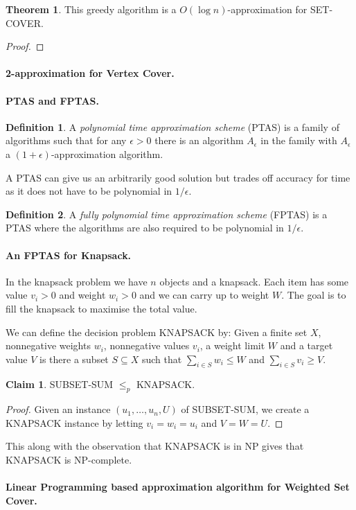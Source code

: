 \documentclass[11pt,a4paper]{article}
\theoremstyle{definition}
\newtheorem{thm}{Theorem}
\newtheorem{claim}{Claim}
\newtheorem{defn}{Definition}
\begin{document}
\begin{thm}
This greedy algorithm is a $O(\log n)$-approximation for SET-COVER.
\end{thm}
\begin{proof}

\end{proof}

\paragraph{2-approximation for Vertex Cover.}

\paragraph{PTAS and FPTAS.}
\begin{defn}
A \emph{polynomial time approximation scheme} (PTAS) is a family of algorithms such that for any $\epsilon > 0$ there is an algorithm $A_\epsilon$ in the family with $A_\epsilon$ a $(1+\epsilon)$-approximation algorithm.
\end{defn}

A PTAS can give us an arbitrarily good solution but trades off accuracy for time as it does not have to be polynomial in $1/\epsilon$.

\begin{defn}
A \emph{fully polynomial time approximation scheme} (FPTAS) is a PTAS where the algorithms are also required to be polynomial in $1/\epsilon$.
\end{defn}

\paragraph{An FPTAS for Knapsack.}
In the knapsack problem we have $n$ objects and a knapsack.
Each item has some value $v_i>0$ and weight $w_i>0$ and we can carry up to weight $W$.
The goal is to fill the knapsack to maximise the total value.

We can define the decision problem KNAPSACK by: Given a finite set $X$, nonnegative weights $w_i$, nonnegative values $v_i$, a weight limit $W$ and a target value $V$ is there a subset $S\subseteq X$ such that $\sum_{i\in S} w_i \le W$ and $\sum_{i\in S} v_i \ge V$.

\begin{claim}
SUBSET-SUM $\le_p$ KNAPSACK.
\end{claim}
\begin{proof}
Given an instance $(u_1,\ldots,u_n,U)$ of SUBSET-SUM, we create a KNAPSACK instance by letting $v_i = w_i = u_i$ and $V = W = U$.
\end{proof}

This along with the observation that KNAPSACK is in NP gives that KNAPSACK is NP-complete.

\paragraph{Linear Programming based approximation algorithm for Weighted Set Cover.}
\end{document}
